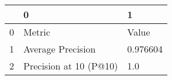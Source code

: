 \begin{tabular}{lll}
\toprule
{} &                       0 &         1 \\
\midrule
0 &                  Metric &     Value \\
1 &       Average Precision &  0.976604 \\
2 &  Precision at 10 (P@10) &       1.0 \\
\bottomrule
\end{tabular}
